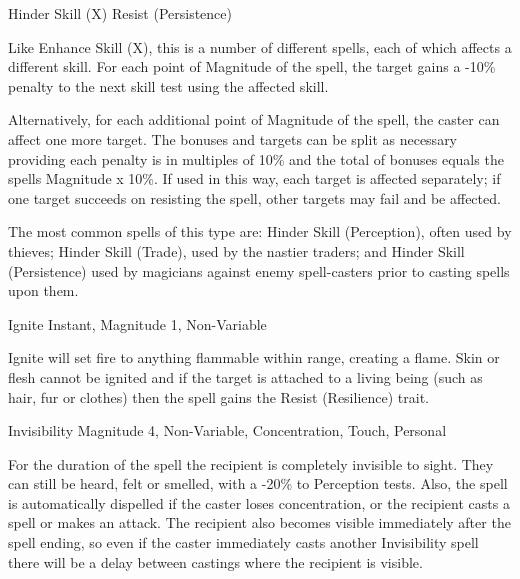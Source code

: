 \begin{rpg-spell}
{Hinder Skill (X)}
{Resist (Persistence)}

Like Enhance Skill (X), this is a number of different spells, each of which affects a different skill. For each point of Magnitude of the spell, the target gains a -10\% penalty to the next skill test using the affected skill.

Alternatively, for each additional point of Magnitude of the spell, the caster can affect one more target.  The bonuses and targets can be split as necessary providing each penalty is in multiples of 10\% and the total of bonuses equals the spells Magnitude x 10\%. If used in this way, each target is affected separately; if one target succeeds on resisting the spell, other targets may fail and be affected.

The most common spells of this type are: Hinder Skill (Perception), often used by thieves; Hinder Skill (Trade), used by the nastier traders; and Hinder Skill (Persistence) used by magicians against enemy spell-casters prior to casting spells upon them.
\end{rpg-spell}


\begin{rpg-spell}
{Ignite}
{Instant, Magnitude 1, Non-Variable}

Ignite will set fire to anything flammable within range, creating a flame. Skin or flesh cannot be ignited and if the target is attached to a living being (such as hair, fur or clothes) then the spell gains the Resist (Resilience) trait. 
\end{rpg-spell}


\begin{rpg-spell}
{Invisibility}
{Magnitude 4, Non-Variable, Concentration, Touch, Personal}

For the duration of the spell the recipient is completely invisible to sight. They can still be heard, felt or smelled, with a -20\% to Perception tests. Also, the spell is automatically dispelled if the caster loses concentration, or the recipient casts a spell or makes an attack. The recipient also becomes visible immediately after the spell ending, so even if the caster immediately casts another Invisibility spell there will be a delay between castings where the recipient is visible.
\end{rpg-spell}

